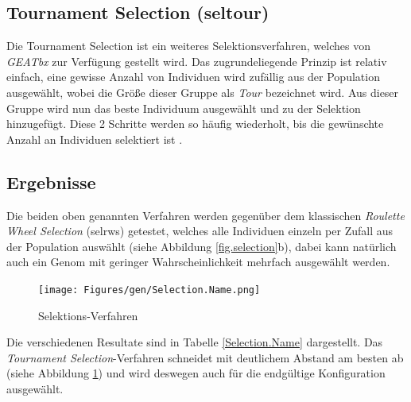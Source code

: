\subsection{Tournament Selection (seltour)}
Die Tournament Selection ist ein weiteres Selektionsverfahren,
welches von \emph{GEATbx} zur Verfügung gestellt wird. Das zugrundeliegende
Prinzip ist relativ einfach, eine gewisse Anzahl von Individuen wird zufällig
aus der Population ausgewählt, wobei die Größe dieser Gruppe als \emph{Tour}
bezeichnet wird. Aus dieser Gruppe wird nun das beste Individuum ausgewählt und
zu der Selektion hinzugefügt. Diese 2 Schritte werden so häufig wiederholt, bis
die gewünschte Anzahl an Individuen selektiert ist \citep{seltour}.


\subsection{Ergebnisse}
Die beiden oben genannten Verfahren werden gegenüber dem
klassischen \emph{Roulette Wheel Selection} (selrws) getestet, welches alle
Individuen einzeln per Zufall aus der Population auswählt (siehe Abbildung
\ref{fig.selection}b), dabei kann natürlich
auch ein Genom mit geringer Wahrscheinlichkeit mehrfach ausgewählt werden.



\begin{figure}[h!]
  \centering
  \texttt{[image: Figures/gen/Selection.Name.png]}
  \caption{Selektions-Verfahren}\label{fig.selectionname}
\end{figure}

\noindent Die verschiedenen Resultate sind in Tabelle \ref{Selection.Name}
dargestellt. Das \emph{Tournament Selection}-Verfahren schneidet mit deutlichem
Abstand am besten ab (siehe Abbildung \ref{fig.selectionname}) und wird deswegen
auch für die endgültige Konfiguration ausgewählt.

